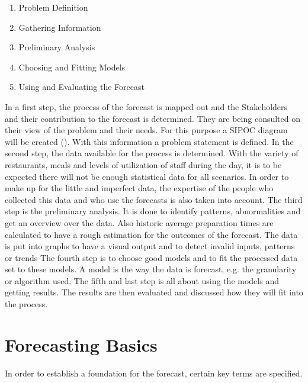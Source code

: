 \begin{enumerate}
\item Problem Definition
\item Gathering Information
\item Preliminary Analysis
\item Choosing and Fitting Models
\item Using and Evaluating the Forecast
\end{enumerate}

In a first step, the process of the forecast is mapped out and the Stakeholders and their contribution to the forecast is determined. They are being consulted on their view of the problem and their needs. For this purpose a SIPOC diagram will be created (\cite{SIPOC}). With this information a problem statement is defined.\newline
In the second step, the data available for the process is determined. With the variety of restaurants, meals and levels of utilization of staff during the day, it is to be expected there will not be enough statistical data for all scenarios. In order to make up for the little and imperfect data, the expertise of the people who collected this data and who use the forecasts is also taken into account.\newline
The third step is the preliminary analysis. It is done to identify patterns, abnormalities and get an overview over the data. Also historic average preparation times are calculated to have a rough estimation for the outcomes of the forecast. The data is put into graphs to have a visual output and to detect invalid inputs, patterns or trends\newline
The fourth step is to choose good models and to fit the processed data set to these models. A model is the way the data is forecast, e.g. the granularity or algorithm used.\newline
The fifth and last step is all about using the models and getting results. The results are then evaluated and discussed how they will fit into the process.
\section{Forecasting Basics}\label{section:Forecast Basics}
In order to establish a foundation for the forecast, certain key terms are specified.
